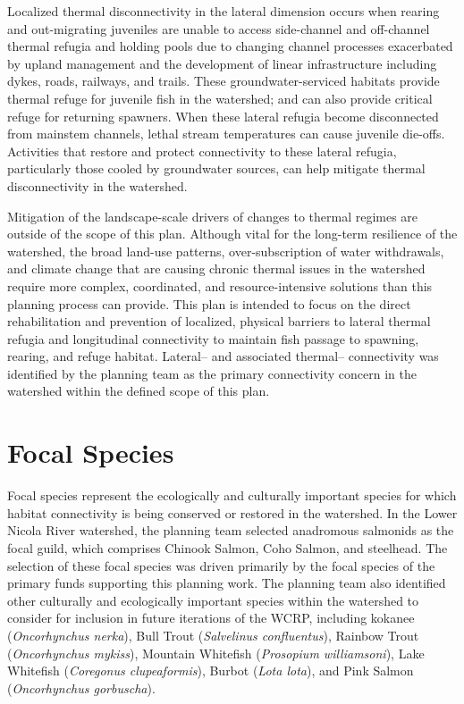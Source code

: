\documentclass[
  letterpaper,
  DIV=11,
  numbers=noendperiod]{scrreprt}
\begin{document}
Localized thermal disconnectivity in the lateral dimension occurs when
rearing and out-migrating juveniles are unable to access side-channel
and off-channel thermal refugia and holding pools due to changing
channel processes exacerbated by upland management and the development
of linear infrastructure including dykes, roads, railways, and trails.
These groundwater-serviced habitats provide thermal refuge for juvenile
fish in the watershed; and can also provide critical refuge for
returning spawners. When these lateral refugia become disconnected from
mainstem channels, lethal stream temperatures can cause juvenile
die-offs. Activities that restore and protect connectivity to these
lateral refugia, particularly those cooled by groundwater sources, can
help mitigate thermal disconnectivity in the watershed.

Mitigation of the landscape-scale drivers of changes to thermal regimes
are outside of the scope of this plan. Although vital for the long-term
resilience of the watershed, the broad land-use patterns,
over-subscription of water withdrawals, and climate change that are
causing chronic thermal issues in the watershed require more complex,
coordinated, and resource-intensive solutions than this planning process
can provide. This plan is intended to focus on the direct rehabilitation
and prevention of localized, physical barriers to lateral thermal
refugia and longitudinal connectivity to maintain fish passage to
spawning, rearing, and refuge habitat. Lateral-- and associated
thermal-- connectivity was identified by the planning team as the
primary connectivity concern in the watershed within the defined scope
of this plan.

\hypertarget{focal-species}{%
\section*{Focal Species}\label{focal-species}}


Focal species represent the ecologically and culturally important
species for which habitat connectivity is being conserved or restored in
the watershed. In the Lower Nicola River watershed, the planning team
selected anadromous salmonids as the focal guild, which comprises
Chinook Salmon, Coho Salmon, and steelhead. The selection of these focal
species was driven primarily by the focal species of the primary funds
supporting this planning work. The planning team also identified other
culturally and ecologically important species within the watershed to
consider for inclusion in future iterations of the WCRP, including
kokanee (\emph{Oncorhynchus nerka}), Bull Trout (\emph{Salvelinus
confluentus}), Rainbow Trout (\emph{Oncorhynchus mykiss}), Mountain
Whitefish (\emph{Prosopium williamsoni}), Lake Whitefish
(\emph{Coregonus clupeaformis}), Burbot (\emph{Lota lota}), and Pink
Salmon (\emph{Oncorhynchus gorbuscha}).
\end{document}
